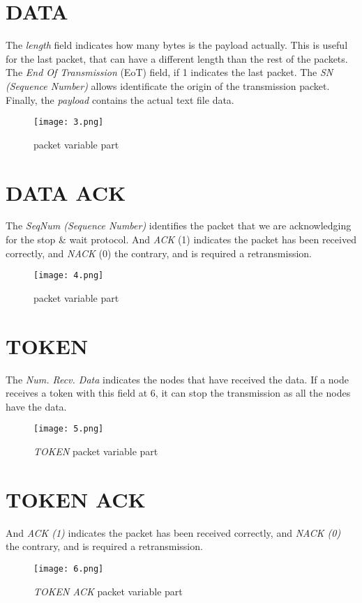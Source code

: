 \section{DATA}
The \textit{length} field indicates how many bytes is the payload actually. This is useful for the last packet, that can have a different length than the rest of the packets. The \textit{End Of Transmission} (EoT) field, if 1 indicates the last packet. The \textit{SN (Sequence Number)} allows identificate the origin of the transmission packet. Finally, the \textit{payload} contains the actual text file data.

\begin{figure}[H] \centering
	\texttt{[image: 3.png]}
	\caption{ packet variable part}
	\label{fig:3-png}
\end{figure}

\section{DATA ACK}
The \textit{SeqNum (Sequence Number)} identifies the packet that we are acknowledging for the stop & wait protocol. And \textit{ACK} (1) indicates the packet has been received correctly, and \textit{NACK} (0) the contrary, and is required a retransmission.

\begin{figure}[H] \centering
	\texttt{[image: 4.png]}
	\caption{ packet variable part}
	\label{fig:4-png}
\end{figure}


\section{TOKEN}
The \textit{Num. Recv. Data} indicates the nodes that have received the data. If a node receives a token with this field at 6, it can stop the transmission as all the nodes have the data.

\begin{figure}[H] \centering
	\texttt{[image: 5.png]}
	\caption{\textit{TOKEN} packet variable part}
	\label{fig:5-png}
\end{figure}

\section{TOKEN ACK}
And \textit{ACK (1)} indicates the packet has been received correctly, and \textit{NACK (0)} the contrary, and is required a retransmission.

\begin{figure}[H] \centering
	\texttt{[image: 6.png]}
	\caption{\textit{TOKEN ACK} packet variable part}
	\label{fig:6-png}
\end{figure}










